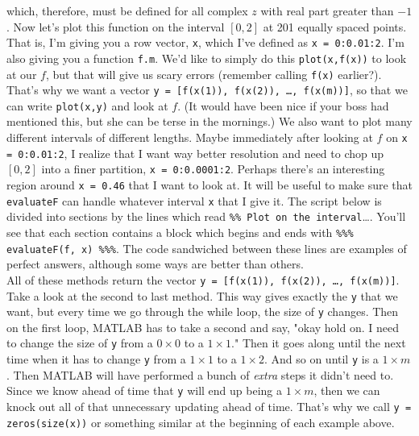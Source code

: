 \documentclass{article}
\begin{document}
{\setlength{\parindent}{0cm}
which, therefore, must be defined for all complex $z$ with real part greater than $-1$. Now let's plot this function on the interval $[0, 2]$ at 201 equally spaced points. That is, I'm giving you a row vector, \texttt{x}, which I've defined as \texttt{x = 0:0.01:2}. I'm also giving you a function \texttt{f.m}. We'd like to simply do this \texttt{plot(x,f(x))} to look at our $f$, but that will give us scary errors (remember calling \texttt{f(x)} earlier?). That's why we want a vector \texttt{y = [f(x(1)), f(x(2)), \dots, f(x(m))]}, so that we can write \texttt{plot(x,y)} and look at $f$. (It would have been nice if your boss had mentioned this, but she can be terse in the mornings.) We also want to plot many different intervals of different lengths. Maybe immediately after looking at $f$ on \texttt{x = 0:0.01:2}, I realize that I want way better resolution and need to chop up $[0, 2]$ into a finer partition, \texttt{x = 0:0.0001:2}. Perhaps there's an interesting region around \texttt{x = 0.46} that I want to look at. It will be useful to make sure that \texttt{evaluateF} can handle whatever interval \texttt{x} that I give it. The script below is divided into sections by the lines which read \texttt{\%\% Plot on the interval}\dots . You'll see that each section contains a block which begins and ends with \texttt{\%\%\% evaluateF(f, x) \%\%\%}. The code sandwiched between these lines are examples of perfect answers, although some ways are better than others. }\\



All of these methods return the vector \texttt{y = [f(x(1)), f(x(2)), \dots, f(x(m))]}. Take a look at the second to last method. This way gives exactly the \texttt{y} that we want, but every time we go through the while loop, the size of \texttt{y} changes. Then on the first loop, MATLAB has to take a second and say, "okay hold on. I need to change the size of \texttt{y} from a $0 \times 0$ to a $1 \times 1$." Then it goes along until the next time when it has to change \texttt{y} from a $1 \times 1$ to a $1 \times 2$. And so on until \texttt{y} is a $1 \times m$. Then MATLAB will have performed a bunch of \textit{extra} steps it didn't need to. Since we know ahead of time that \texttt{y} will end up being a $1 \times m$, then we can knock out all of that unnecessary updating ahead of time. That's why we call \texttt{y = zeros(size(x))} or something similar at the beginning of each example above.\\
\end{document}
